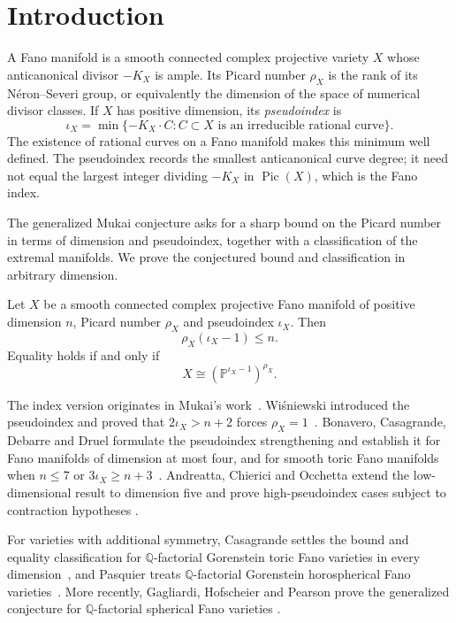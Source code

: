 \section{Introduction}\label{sec:introduction}

A Fano manifold is a smooth connected complex projective variety $X$
whose anticanonical divisor $-K_X$ is ample. Its Picard number
$\rho_X$ is the rank of its N\'eron--Severi group, or equivalently the
dimension of the space of numerical divisor classes. If $X$ has positive
dimension, its \emph{pseudoindex} is
\[
 \iota_X=\min\{-K_X\cdot C:C\subset X
                  \text{ is an irreducible rational curve}\}.
\]
The existence of rational curves on a Fano manifold makes this minimum
well defined. The pseudoindex records the smallest anticanonical curve
degree; it need not equal the largest integer dividing $-K_X$ in
$\operatorname{Pic}(X)$, which is the Fano index.

The generalized Mukai conjecture asks for a sharp bound on the Picard
number in terms of dimension and pseudoindex, together with a
classification of the extremal manifolds. We prove the conjectured bound
and classification in arbitrary dimension.

\begin{theorem}\label{thm:main}
Let $X$ be a smooth connected complex projective Fano manifold of
positive dimension $n$, Picard number $\rho_X$ and pseudoindex $\iota_X$.
Then
\[
 \rho_X(\iota_X-1)\le n.
\]
Equality holds if and only if
\[
 X\cong(\mathbb P^{\iota_X-1})^{\rho_X}.
\]
\end{theorem}

The index version originates in Mukai's work~\cite{Mukai1988}.
Wi\'{s}niewski introduced the pseudoindex and proved that
$2\iota_X>n+2$ forces $\rho_X=1$~\cite[Theorem~A]{Wisniewski1990}.
Bonavero, Casagrande, Debarre and Druel formulate the pseudoindex
strengthening and establish it for Fano manifolds of dimension at most
four, and for smooth toric Fano manifolds when $n\le7$ or
$3\iota_X\ge n+3$~\cite{BCDD2003}. Andreatta, Chierici and Occhetta
extend the low-dimensional result to dimension five and prove
high-pseudoindex cases subject to contraction hypotheses
\cite{AndreattaChiericiOcchetta2004}.

For varieties with additional symmetry,
Casagrande settles the bound and equality classification for
$\mathbb Q$-factorial Gorenstein toric Fano varieties in every
dimension~\cite[Theorem~1(ii)]{Casagrande2006}, and Pasquier treats
$\mathbb Q$-factorial Gorenstein horospherical Fano
varieties~\cite[Theorem~1]{Pasquier2010}. More recently, Gagliardi,
Hofscheier and Pearson prove the generalized conjecture for
$\mathbb Q$-factorial spherical Fano varieties
\cite{GagliardiHofscheierPearson2025}.

